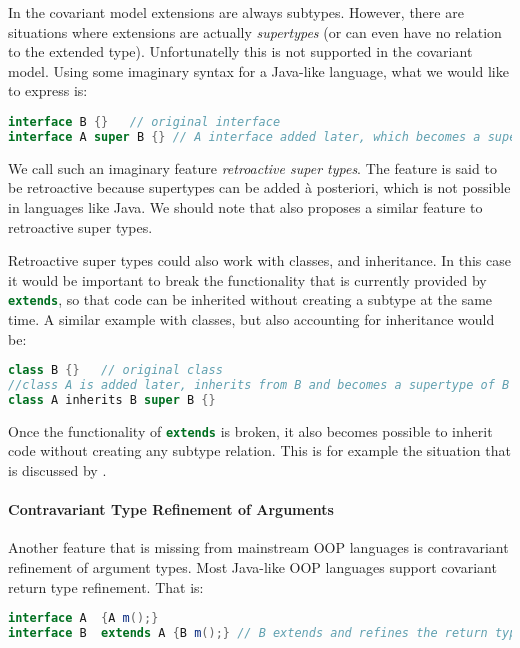 In the covariant model extensions are always subtypes. However, 
there are situations where extensions are actually
\emph{supertypes} (or can even have no relation to the extended type). Unfortunatelly this is not supported in the
covariant model. Using some imaginary syntax for a Java-like language, 
what we would like to express is:

\begin{lstlisting}[language=java]
interface B {}   // original interface
interface A super B {} // A interface added later, which becomes a supertype of B
\end{lstlisting}

\noindent We call such an imaginary feature \emph{retroactive super types}. The
feature is said to be retroactive because supertypes can be added \`a
posteriori, which is not possible in languages like Java. We should note that
\citet{ostermann2008nominal} also proposes a similar feature to retroactive
super types.

Retroactive super types could also work with classes, and
inheritance. In this case it would be important to break the
functionality that is currently provided by \lstinline[language=java]{extends}, so that
code can be inherited without creating a subtype at the same time. 
A similar example with classes, but also accounting for inheritance 
would be:

\begin{lstlisting}[language=java]
class B {}   // original class
//class A is added later, inherits from B and becomes a supertype of B
class A inherits B super B {}
\end{lstlisting}

\noindent Once the functionality of \lstinline[language=java]{extends} is broken, it also
becomes possible to inherit code without creating any subtype
relation. This is for example the situation that is discussed by \citet{cook1989inheritance}.

\paragraph{Contravariant Type Refinement of Arguments}
Another feature that is missing from mainstream OOP languages is 
contravariant refinement of argument types. Most Java-like OOP languages support covariant return type 
refinement. That is:

\begin{lstlisting}[language=java]
interface A  {A m();} 
interface B  extends A {B m();} // B extends and refines the return type of m() to a subtype
\end{lstlisting}

